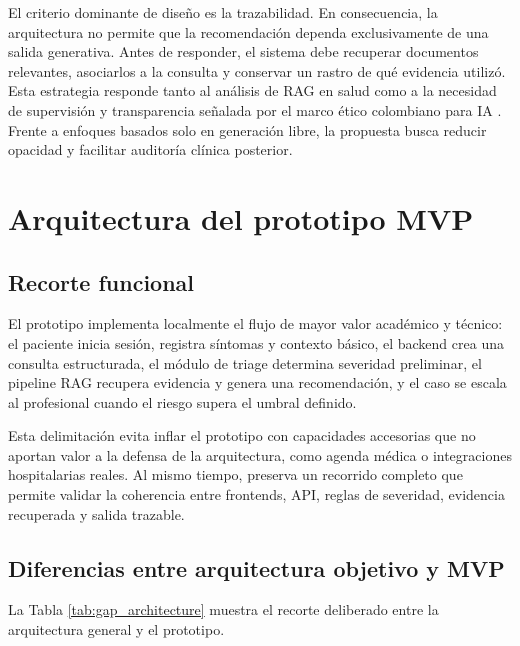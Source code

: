 \documentclass[12pt]{article}
\begin{document}
El criterio dominante de diseño es la trazabilidad. En consecuencia, la arquitectura no permite que la recomendación dependa exclusivamente de una salida generativa. Antes de responder, el sistema debe recuperar documentos relevantes, asociarlos a la consulta y conservar un rastro de qué evidencia utilizó. Esta estrategia responde tanto al análisis de RAG en salud \cite{neha2024} como a la necesidad de supervisión y transparencia señalada por el marco ético colombiano para IA \cite{minciencias2021}. Frente a enfoques basados solo en generación libre, la propuesta busca reducir opacidad y facilitar auditoría clínica posterior.

\section{Arquitectura del prototipo MVP}

\subsection{Recorte funcional}

El prototipo implementa localmente el flujo de mayor valor académico y técnico: el paciente inicia sesión, registra síntomas y contexto básico, el backend crea una consulta estructurada, el módulo de triage determina severidad preliminar, el pipeline RAG recupera evidencia y genera una recomendación, y el caso se escala al profesional cuando el riesgo supera el umbral definido.

Esta delimitación evita inflar el prototipo con capacidades accesorias que no aportan valor a la defensa de la arquitectura, como agenda médica o integraciones hospitalarias reales. Al mismo tiempo, preserva un recorrido completo que permite validar la coherencia entre frontends, API, reglas de severidad, evidencia recuperada y salida trazable.

\subsection{Diferencias entre arquitectura objetivo y MVP}

La Tabla \ref{tab:gap_architecture} muestra el recorte deliberado entre la arquitectura general y el prototipo.
\end{document}
